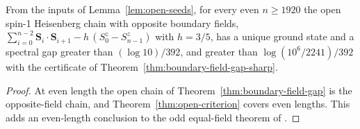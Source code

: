\begin{theorem}
  \label{thm:opposite-field-gap}
  \leanok
  From the inputs of Lemma~\ref{lem:open-seeds}, for every even \(n \ge 1920\) the open spin-1
  Heisenberg chain with opposite boundary fields,
  \(\sum_{i=0}^{n-2} \mathbf S_i \cdot \mathbf S_{i+1} - h\,(S_0^z - S_{n-1}^z)\) with \(h = 3/5\),
  has a unique ground state and a spectral gap greater than \((\log 10)/392\), and greater than
  \(\log(10^6/2241)/392\) with the certificate of Theorem~\ref{thm:boundary-field-gap-sharp}.
\end{theorem}
\begin{proof}
  \leanok
  At even length the open chain of Theorem~\ref{thm:boundary-field-gap} is the opposite-field chain,
  and Theorem~\ref{thm:open-criterion} covers even lengths.
  This adds an even-length conclusion to the odd equal-field theorem of
  \cite[Theorem 1.1]{OpenAIBoundary}.
\end{proof}
